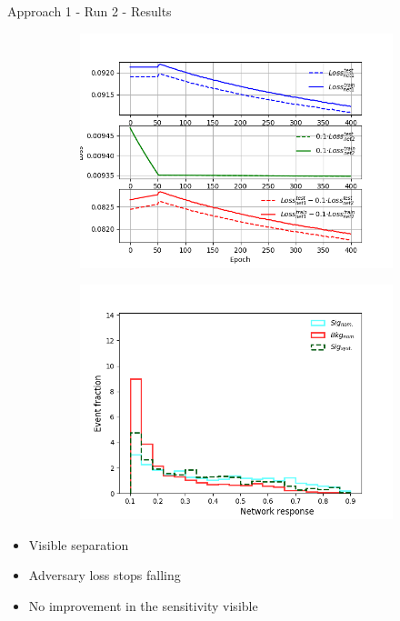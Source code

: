 \begin{frame}{Approach 1 - Run 2 - Results}
    \begin{figure}[htbp]
    \centering
    \begin{subfigure}[b]{0.47\textwidth}
        \includegraphics[width=\textwidth]{app1/half_classic_losses.png}
        \label{fig:simple:final:sepa}
    \end{subfigure}
\quad
    \begin{subfigure}[b]{0.47\textwidth}
        \includegraphics[width=\textwidth]{app1/half_classic_syst.png}
        \label{fig:simple:final:syst}
    \end{subfigure}
    \end{figure}
    \begin{itemize}
        \item Visible separation
        \item Adversary loss stops falling
        \item No improvement in the sensitivity visible
    \end{itemize}
\end{frame}

